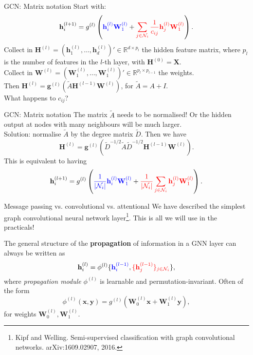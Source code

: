 \documentclass{beamer}
\begin{document}
\begin{frame}{GCN: Matrix notation}
Start with:
\[
\mathbf{h}_i^{(l+1)}=g^{(l)}\left({\color{blue}\mathbf{h}_i^{(l)}\mathbf{W}_1^{(l)}}+{\color{red}\sum_{j\in\mathcal{N}_i}\frac{1}{c_{ij}}\mathbf{h}_j^{(l)}\mathbf{W}_1^{(l)}}\right).
\]
Collect in $\mathbf{H}^{(l)}=(\mathbf{h}_1^{(l)},\dots,\mathbf{h}_d^{(l)})'\in \mathbb{R}^{d \times p_l}$ the hidden feature matrix, where $p_{l}$ is the number of features in the $l$-th layer, with $\mathbf{H}^{(0)}=\mathbf{X}$.\\ Collect in $\mathbf{W}^{(l)}=(\mathbf{W}_1^{(l)},\dots,\mathbf{W}_{1}^{(l)})'\in \mathbb{R}^{p_l\times p_{l-1}}$ the weights.\\
Then $\mathbf{H}^{(l)}=\mathbf{g}^{(l)}(\tilde{A}\mathbf{H}^{(l-1)}\mathbf{W}^{(l)})$, for $\tilde{A}=A+I$.\\

What happens to $c_{ij}$?
\end{frame}
\begin{frame}{GCN: Matrix notation}
The matrix $\tilde{A}$ needs to be normalised! Or the hidden output at nodes with many neighbours will be much larger.\\

Solution: normalise $\tilde{A}$ by the degree matrix $\tilde{D}$. Then we have
\[
\mathbf{H}^{(l)}=\mathbf{g}^{(l)}(\tilde{D}^{-1/2}\tilde{A}\tilde{D}^{-1/2}\mathbf{H}^{(l-1)}\mathbf{W}^{(l)}).
\]
This is equivalent to having
\[
\mathbf{h}_i^{(l+1)}=g^{(l)}\left({\color{blue}\frac{1}{|\mathcal{N}_i|}\mathbf{h}_i^{(l)}\mathbf{W}_1^{(l)}}+{\color{red}\frac{1}{|\mathcal{N}_i|}\sum_{j\in\mathcal{N}_i}\mathbf{h}_j^{(l)}\mathbf{W}_1^{(l)}}\right).
\]
\end{frame}
\begin{frame}{Message passing vs. convolutional vs. attentional}
We have described the simplest graph convolutional neural network layer\footnote{Kipf and Welling. Semi-supervised classification with graph
convolutional networks. arXiv:1609.02907, 2016.}. This is all we will use in the practicals!

The general structure of the \textbf{propagation} of information in a GNN layer can always be written as 
\[
\mathbf{h}_i^{(l)}=\phi^{(l)}\{{\color{blue}\mathbf{h}_i^{(l-1)}},{\color{red}\{\mathbf{h}_j^{(l-1)}\}_{j\in\mathcal{N}_i}}\},
\]
where \textit{propagation module} $\phi^{(l)}$ is learnable and permutation-invariant. Often of the form
\[
\phi^{(l)}(\mathbf{x},\mathbf{y})=g^{(l)}(\mathbf{W}_0^{(l)}\mathbf{x}+\mathbf{W}_1^{(l)}\mathbf{y}),
\]
for weights $\mathbf{W}_0^{(l)},\mathbf{W}_1^{(l)}$.
\end{frame}
\end{document}
